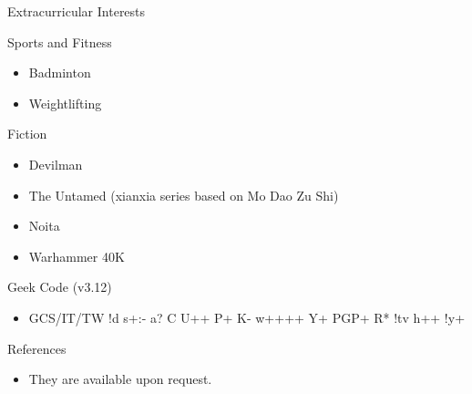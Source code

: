 \documentclass[]{mcdowellcv}
\begin{document}
	\begin{cvsection}{Extracurricular Interests}
		\begin{cvsubsection}{Sports and Fitness}{}{}
			\begin{itemize}
				\item Badminton
				\item Weightlifting
			\end{itemize}
		\end{cvsubsection}
		\begin{cvsubsection}{Fiction}{}{}
			\begin{itemize}
				\item Devilman
				\item The Untamed (xianxia series based on Mo Dao Zu Shi)
				\item Noita
				\item Warhammer 40K
			\end{itemize}
		\end{cvsubsection}
		\begin{cvsubsection}{Geek Code (v3.12)}{}{}
			\begin{itemize}
				\item GCS/IT/TW !d s+:- a? C U++ P+ K- w++++ Y+ PGP+ R* !tv h++ !y+
			\end{itemize}
		\end{cvsubsection}
	\end{cvsection}

	\begin{cvsection}{References}
		\begin{cvsubsection}{}{}{}
			\begin{itemize}
				\item They are available upon request.
			\end{itemize}
		\end{cvsubsection}
	\end{cvsection}
\end{document}
